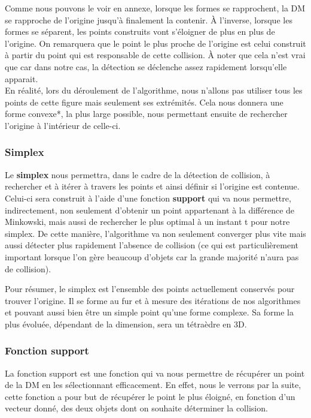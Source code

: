 Comme nous pouvons le voir en annexe, lorsque les formes se rapprochent, la DM se rapproche de l'origine jusqu'à finalement la contenir. À l'inverse, lorsque les formes se séparent, les points construits vont s'éloigner de plus en plus de l'origine. On remarquera que le point le plus proche de l'origine est celui construit à partir du point qui est responsable de cette collision. À noter que cela n'est vrai que car dans notre cas, la détection se déclenche assez rapidement lorsqu'elle apparait.\\
En réalité, lors du déroulement de l'algorithme, nous n'allons pas utiliser tous les points de cette figure mais seulement ses extrémités. Cela nous donnera une forme convexe*, la plus large possible, nous permettant ensuite de rechercher l'origine à l'intérieur de celle-ci.

\subsubsection{Simplex}

Le \textbf{simplex} nous permettra, dans le cadre de la détection de collision, à rechercher et à itérer à travers les points et ainsi définir si l'origine est contenue. Celui-ci sera construit à l'aide d'une fonction \textbf{support} qui va nous permettre, indirectement, non seulement d'obtenir un point appartenant à la différence de Minkowski, mais aussi de rechercher le plus optimal à un instant t pour notre simplex. De cette manière, l'algorithme va non seulement converger plus vite mais aussi détecter plus rapidement l'absence de collision (ce qui est particulièrement important lorsque l'on gère beaucoup d'objets car la grande majorité n'aura pas de collision).
\pagebreak

Pour résumer, le simplex est l'ensemble des points actuellement conservés pour trouver l'origine. Il se forme au fur et à mesure des itérations de nos algorithmes et pouvant aussi bien être un simple point qu'une forme complexe. Sa forme la plus évoluée, dépendant de la dimension, sera un tétraèdre en 3D.

\subsubsection{Fonction support}
La fonction support est une fonction qui va nous permettre de récupérer un point de la DM en les sélectionnant efficacement. En effet, nous le verrons par la suite, cette fonction a pour but de récupérer le point le plus éloigné, en fonction d'un vecteur donné, des deux objets dont on souhaite déterminer la collision.

